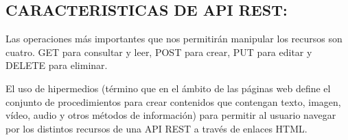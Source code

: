 \subsection{CARACTERISTICAS DE API REST:}
 Las operaciones más importantes que nos permitirán manipular los recursos son cuatro.
 GET para consultar y leer, POST para crear, PUT para editar y DELETE para eliminar.

 El uso de hipermedios (término que en el ámbito de las páginas web define el conjunto de procedimientos para crear contenidos que contengan texto, imagen, vídeo, audio y otros métodos de información) para permitir al usuario navegar por los distintos recursos de una API REST a través de enlaces HTML.

